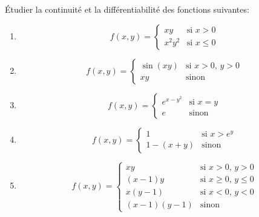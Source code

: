 
\begin{exercice}\label{exo0044}

Étudier la continuité et la différentiabilité des fonctions suivantes:
\begin{multicols}{2}
\begin{enumerate}
	\item
	\begin{equation}
		f(x,y)=
			\begin{cases}
				xy	&	\text{si $x>0$}\\
				x^2y^2	&	 \text{si $x\leq 0$}
			\end{cases}
	\end{equation}

	\item		\label{Item0044b}
	\begin{equation}
		f(x,y)=
			\begin{cases}
				\sin(xy)	&	\text{si $x>0$, $y>0$}\\
				xy	&	 \text{sinon}
			\end{cases}
	\end{equation}
	\item
	\begin{equation}
		f(x,y)=
			\begin{cases}
				 e^{x-y^2}	&	\text{si $x=y$}\\
				e	&	 \text{sinon}
			\end{cases}
	\end{equation}
	\item
	\begin{equation}
		f(x,y)=
			\begin{cases}
				1	&	\text{si $x>e^y$}\\
				1-(x+y)	&	 \text{sinon}
			\end{cases}
	\end{equation}
	\item
	\begin{equation}
		f(x,y)=
			\begin{cases}
				xy	&	\text{si $x>0$, $y>0$}\\
				(x-1)y	&	 \text{si $x\geq 0$, $y\leq 0$}\\
				x(y-1)	&	 \text{si $x<0$, $y<0$}\\
				(x-1)(y-1)	&	 \text{sinon}
			\end{cases}
	\end{equation}
\end{enumerate}
\end{multicols}

\end{exercice}
